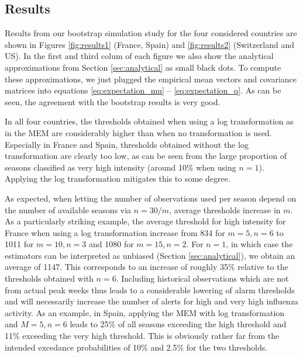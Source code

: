 \documentclass{article}
\begin{document}
\subsection{Results}

Results from our bootstrap simulation study for the four considered countries are shown in Figures \ref{fig:results1} (France, Spain) and \ref{fig:results2} (Switzerland and US). In the first and third colum of each figure we also show the analytical approximations from Section \ref{sec:analytical} as small black dots. To compute these approximations, we just plugged the empirical mean vectors and covariance matrices into equations \eqref{eq:expectation_mu} -- \eqref{eq:expectation_q}. As can be seen, the agreement with the bootstrap results is very good.

In all four countries, the thresholds obtained when using a log transformation as in the MEM are considerably higher than when no transformation is used. Especially in France and Spain, thresholds obtained without the log transformation are clearly too low, as can be seen from the large proportion of seasons classified as very high intensity (around 10\% when using $n = 1$). Applying the log transformation mitigates this to some degree. 

As expected, when letting the number of observations used per season depend on the number of available seasons via $n = 30/m$, average thresholds increase in $m$. As a particularly striking example, the average threshold for high intensity for France when using a log transformation increase from %
834 for $m = 5, n = 6$ to 1011 for $m = 10, n = 3$ and 1080 for $m = 15, n = 2$. For $n = 1$, in which case the estimators can be interpreted as unbiased (Section \ref{sec:analytical}), we obtain an average of 1147. This corresponds to an increase of roughly 35\% relative to the thresholds obtained with $n = 6$. Including historical observations which are not from actual peak weeks thus leads to a considerable lowering of alarm thresholds and will necessarily increase the number of alerts for high and very high influenza activity. As an example, in Spain, applying the MEM with log transformation and $M = 5, n = 6$ leads to 25\% of all seasons exceeding the high threshold and 11\% exceeding the very high threshold. This is obviously rather far from the intended excedance probabilities of 10\% and 2.5\% for the two thresholds.
\end{document}
